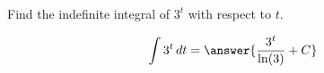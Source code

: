 \documentclass{ximera}
\author{Gregory Hartman \and Matthew Carr}
\begin{document}
\begin{exercise}


Find the indefinite integral of $3^t$ with respect to $t$.

\[
\int 3^{t}\d t=\answer{\frac{3^{t}}{\ln(3)}+C}
\]


\end{exercise}
\end{document}
